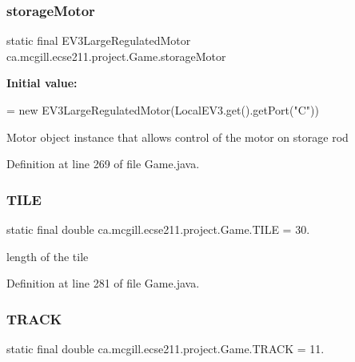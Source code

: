 \subsubsection{\texorpdfstring{storage\+Motor}{storageMotor}}
{\footnotesize\ttfamily  static  final E\+V3\+Large\+Regulated\+Motor ca.\+mcgill.\+ecse211.\+project.\+Game.\+storage\+Motor\hspace{0.3cm}{\ttfamily [static]}}

{\bfseries Initial value\+:}
\begin{DoxyCode}
=
      \textcolor{keyword}{new} EV3LargeRegulatedMotor(LocalEV3.get().getPort(\textcolor{stringliteral}{"C"}))
\end{DoxyCode}
Motor object instance that allows control of the motor on storage rod 

Definition at line 269 of file Game.\+java.

\mbox{\label{enumca_1_1mcgill_1_1ecse211_1_1project_1_1_game_a72c2224ad4dd557dde445ebc4baaf531}} 
\subsubsection{\texorpdfstring{T\+I\+LE}{TILE}}
{\footnotesize\ttfamily  static  final double ca.\+mcgill.\+ecse211.\+project.\+Game.\+T\+I\+LE = 30.\hspace{0.3cm}{\ttfamily [static]}}

length of the tile 

Definition at line 281 of file Game.\+java.

\mbox{\label{enumca_1_1mcgill_1_1ecse211_1_1project_1_1_game_a64cf12cdd6772ac1ce351ff1dfadd626}} 
\subsubsection{\texorpdfstring{T\+R\+A\+CK}{TRACK}}
{\footnotesize\ttfamily  static  final double ca.\+mcgill.\+ecse211.\+project.\+Game.\+T\+R\+A\+CK = 11.\hspace{0.3cm}{\ttfamily [static]}}

